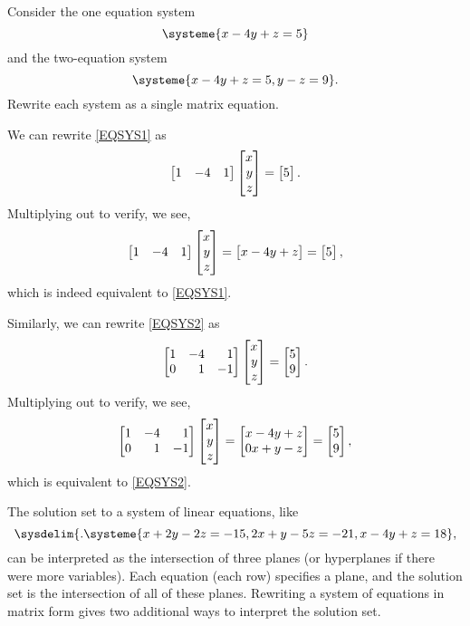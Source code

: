 \begin{example}
	Consider the one equation system
	\begin{equation}
		\label{EQSYS1}
		\systeme{x-4y+z=5}
	\end{equation}
	and the two-equation system
	\begin{equation}
		\label{EQSYS2}
		\systeme{x-4y+z=5, y-z=9}.
	\end{equation}
	Rewrite each system as a single matrix equation.

	We can rewrite \eqref{EQSYS1} as
	\[
        \mat{1&-4&1}\mat{x\\y\\z}=\mat{5}.
    \]
    Multiplying out to verify, we see,
    \[
        \mat{1&-4&1}\mat{x\\y\\z}=\mat{x-4y+z}=\mat{5},
    \]
    which is indeed equivalent to \eqref{EQSYS1}.

	Similarly, we can rewrite \eqref{EQSYS2} as
	\[
       \mat{1&-4&1\\0&1&-1}\mat{x\\y\\z}=\mat{5\\9}.
    \]
    Multiplying out to verify, we see,
    \[
       \mat{1&-4&1\\0&1&-1}\mat{x\\y\\z}=\mat{x-4y+z\\0x+y-z}=\mat{5\\9},
    \]
    which is equivalent to \eqref{EQSYS2}.
\end{example}


The solution set to a system of linear equations, like
\begin{equation}
	\label{EQREGSYSb}
	\sysdelim\{.
		\systeme{
			x+2y-2z=-15,
			2x+y-5z=-21,
			x-4y+z=18
		},
\end{equation}
can be interpreted as the intersection of three planes (or hyperplanes if there were more variables).
Each equation (each row) specifies a plane, and the solution set is the intersection of all of these planes.
Rewriting a system of equations in matrix form gives two additional ways to interpret  the solution set.


